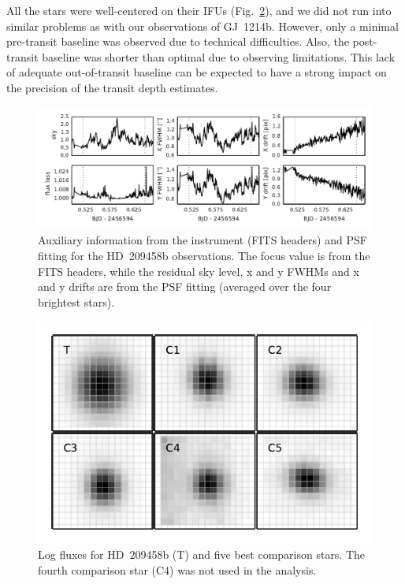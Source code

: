 \documentclass[useAMS,usenatbib]{mn2e}
\begin{document}
All the stars were well-centered on their IFUs (Fig.~\ref{fig:hd_209458b_target_images}), and we did not run into 
similar problems as with our observations of GJ~1214b. However, only a minimal pre-transit baseline was observed due to 
technical difficulties. Also, the post-transit baseline was shorter than optimal due to observing limitations. This 
lack of adequate out-of-transit baseline can be expected to have a strong impact on the precision of the transit depth 
estimates.

\begin{figure}
 \centering
 \includegraphics[width=\textwidth]{hd_209458b_aux_pars.pdf}
 \caption{Auxiliary information from the instrument (FITS headers) and PSF fitting for the HD~209458b observations. The 
  focus value is from the FITS headers, while the residual sky level, x and y FWHMs and x and y drifts are from the PSF 
  fitting (averaged over the four brightest stars).}
 \label{fig:hd_209458b_aux_pars}
\end{figure}

\begin{figure}
 \centering
 \includegraphics[width=\columnwidth]{hd_209458b_ifus.pdf}
 \caption{Log fluxes for HD~209458b (T) and five best comparison stars. The fourth comparison star (C4) was not used in 
  the analysis.}
 \label{fig:hd_209458b_target_images}
\end{figure}
\end{document}
